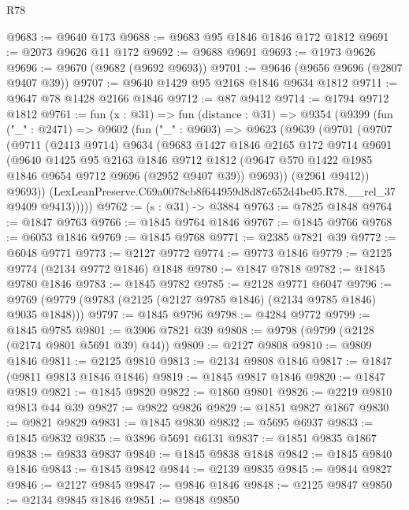 \begin{lexlean}{R78}
\begin{coremodule}
@9683 := @9640 @173
@9688 := @9683 @95 @1846 @1846 @172 @1812
@9691 := @2073 @9626 @11 @172
@9692 := @9688 @9691
@9693 := @1973 @9626
@9696 := @9670 (@9682 (@9692 @9693))
@9701 := @9646 (@9656 @9696 (@2807 @9407 @39))
@9707 := @9640 @1429 @95 @2168 @1846 @9634 @1812
@9711 := @9647 @78 @1428 @2166 @1846
@9712 := @87 @9412
@9714 := @1794 @9712 @1812
@9761 := fun (x : @31) =>
  fun (distance : @31) =>
  @9354
    (@9399
      (fun ("_" : @2471) =>
      @9602
        (fun ("_" : @9603) =>
        @9623
          (@9639
            (@9701
              (@9707
                (@9711
                  (@2413 @9714)
                  @9634
                  (@9683
                    @1427
                    @1846
                    @2165
                    @172
                    @9714
                    @9691
                    (@9640
                      @1425
                      @95
                      @2163
                      @1846
                      @9712
                      @1812
                      (@9647 @570 @1422 @1985 @1846 @9654 @9712 @9696 (@2952 @9407 @39))
                      @9693))
                  (@2961 @9412))
                @9693))
            (LexLeanPreserve.C69a0078cb8f644959d8d87c652d4be05.R78.__rel_37 @9409 @9413)))))
@9762 := (s : @31) -> @3884
@9763 := @7825 @1848
@9764 := @1847 @9763
@9766 := @1845 @9764 @1846
@9767 := @1845 @9766
@9768 := @6053 @1846
@9769 := @1845 @9768
@9771 := @2385 @7821 @39
@9772 := @6048 @9771
@9773 := @2127 @9772
@9774 := @9773 @1846
@9779 := @2125 @9774 (@2134 @9772 @1846) @1848
@9780 := @1847 @7818
@9782 := @1845 @9780 @1846
@9783 := @1845 @9782
@9785 := @2128 @9771 @6047
@9796 := @9769 (@9779 (@9783 (@2125 (@2127 @9785 @1846) (@2134 @9785 @1846) @9035 @1848)))
@9797 := @1845 @9796
@9798 := @4284 @9772
@9799 := @1845 @9785
@9801 := @3906 @7821 @39
@9808 := @9798 (@9799 (@2128 (@2174 @9801 @5691 @39) @44))
@9809 := @2127 @9808
@9810 := @9809 @1846
@9811 := @2125 @9810
@9813 := @2134 @9808 @1846
@9817 := @1847 (@9811 @9813 @1846 @1846)
@9819 := @1845 @9817 @1846
@9820 := @1847 @9819
@9821 := @1845 @9820
@9822 := @1860 @9801
@9826 := @2219 @9810 @9813 @44 @39
@9827 := @9822 @9826
@9829 := @1851 @9827 @1867
@9830 := @9821 @9829
@9831 := @1845 @9830
@9832 := @5695 @6937
@9833 := @1845 @9832
@9835 := @3896 @5691 @6131
@9837 := @1851 @9835 @1867
@9838 := @9833 @9837
@9840 := @1845 @9838 @1848
@9842 := @1845 @9840 @1846
@9843 := @1845 @9842
@9844 := @2139 @9835
@9845 := @9844 @9827
@9846 := @2127 @9845
@9847 := @9846 @1846
@9848 := @2125 @9847
@9850 := @2134 @9845 @1846
@9851 := @9848 @9850

\end{coremodule}
\end{lexlean}

